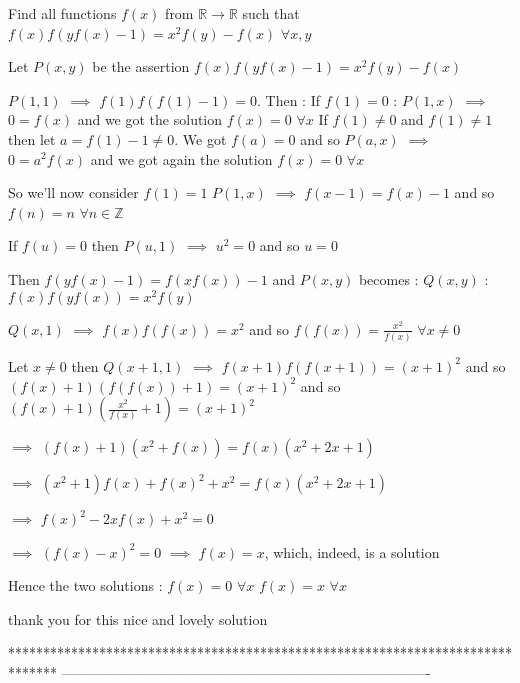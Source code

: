 \begin{solution}
	\begin{tcolorbox}Find all functions $ f(x)$ from $ \mathbb R\to\mathbb R$ such that $ f(x)f(yf(x)-1)=x^2f(y)-f(x)$ $ \forall x,y$\end{tcolorbox}

Let $ P(x,y)$ be the assertion $ f(x)f(yf(x)-1)=x^2f(y)-f(x)$

$ P(1,1)$ $ \implies$ $ f(1)f(f(1)-1)=0$. Then :
If $ f(1)=0$ : $ P(1,x)$ $ \implies$ $ 0=f(x)$ and we got the solution $ f(x)=0$ $ \forall x$
If $ f(1)\ne 0$ and $ f(1)\ne 1$ then let $ a=f(1)-1\ne 0$. We got $ f(a)=0$ and so $ P(a,x)$ $ \implies$ $ 0=a^2f(x)$ and we got again the solution $ f(x)=0$ $ \forall x$

So we'll now consider $ f(1)=1$
$ P(1,x)$ $ \implies$ $ f(x-1)=f(x)-1$ and so $ f(n)=n$ $ \forall n\in\mathbb Z$

If $ f(u)=0$ then $ P(u,1)$ $ \implies$ $ u^2=0$  and so $ u=0$ 

Then $ f(yf(x)-1)=f(xf(x))-1$ and $ P(x,y)$ becomes : $ Q(x,y)$ : $ f(x)f(yf(x))=x^2f(y)$

$ Q(x,1)$ $ \implies$ $ f(x)f(f(x))=x^2$ and so $ f(f(x))=\frac {x^2}{f(x)}$ $ \forall x\ne 0$

Let $ x\ne 0$ then $ Q(x+1,1)$ $ \implies$ $ f(x+1)f(f(x+1))=(x+1)^2$ and so $ (f(x)+1)(f(f(x))+1)=(x+1)^2$ and so $ (f(x)+1)(\frac {x^2}{f(x)}+1)=(x+1)^2$

$ \implies$ $ (f(x)+1)(x^2+f(x))=f(x)(x^2+2x+1)$

$ \implies$ $ (x^2+1)f(x) + f(x)^2+x^2=f(x)(x^2+2x+1)$

$ \implies$ $ f(x)^2-2xf(x)+x^2=0$

$ \implies$ $ (f(x)-x)^2=0$ $ \implies$ $ f(x)=x$, which, indeed, is a solution

Hence the two solutions :
$ f(x)=0$ $ \forall x$
$ f(x)=x$ $ \forall x$
\end{solution}



\begin{solution}
	thank you for this nice and lovely solution 
\end{solution}
*******************************************************************************
-------------------------------------------------------------------------------

